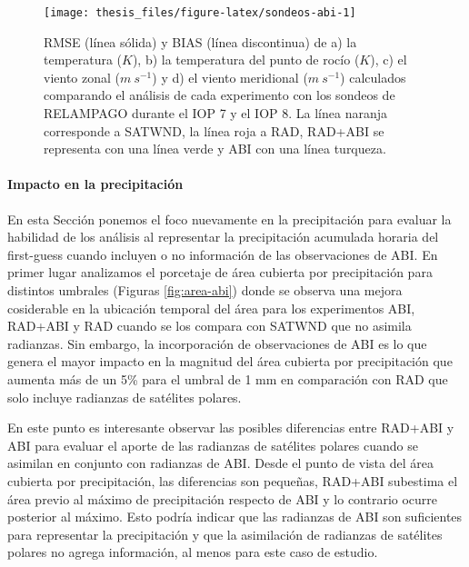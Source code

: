 \documentclass[12pt,oneside,a4paper]{reedthesis}
\begin{document}
\begin{figure}

{\centering \texttt{[image: thesis\_files/figure-latex/sondeos-abi-1]} 

}

\caption{RMSE (línea sólida) y BIAS (línea discontinua) de a) la temperatura (\(K\)), b) la temperatura del punto de rocío (\(K\)), c) el viento zonal (\(m\ s^{-1}\)) y d) el viento meridional (\(m\ s^{-1}\)) calculados comparando el análisis de cada experimento con los sondeos de RELAMPAGO durante el IOP 7 y el IOP 8. La línea naranja corresponde a SATWND, la línea roja a RAD, RAD+ABI se representa con una línea verde y ABI con una línea turqueza.}\label{fig:sondeos-abi}
\end{figure}
\hypertarget{impacto-en-la-precipitaciuxf3n}{%
\paragraph{Impacto en la precipitación}\label{impacto-en-la-precipitaciuxf3n}}

En esta Sección ponemos el foco nuevamente en la precipitación para evaluar la habilidad de los análisis al representar la precipitación acumulada horaria del first-guess cuando incluyen o no información de las observaciones de ABI. En primer lugar analizamos el porcetaje de área cubierta por precipitación para distintos umbrales (Figuras \ref{fig:area-abi}) donde se observa una mejora cosiderable en la ubicación temporal del área para los experimentos ABI, RAD+ABI y RAD cuando se los compara con SATWND que no asimila radianzas. Sin embargo, la incorporación de observaciones de ABI es lo que genera el mayor impacto en la magnitud del área cubierta por precipitación que aumenta más de un 5\% para el umbral de 1 mm en comparación con RAD que solo incluye radianzas de satélites polares.

En este punto es interesante observar las posibles diferencias entre RAD+ABI y ABI para evaluar el aporte de las radianzas de satélites polares cuando se asimilan en conjunto con radianzas de ABI. Desde el punto de vista del área cubierta por precipitación, las diferencias son pequeñas, RAD+ABI subestima el área previo al máximo de precipitación respecto de ABI y lo contrario ocurre posterior al máximo. Esto podría indicar que las radianzas de ABI son suficientes para representar la precipitación y que la asimilación de radianzas de satélites polares no agrega información, al menos para este caso de estudio.
\end{document}
